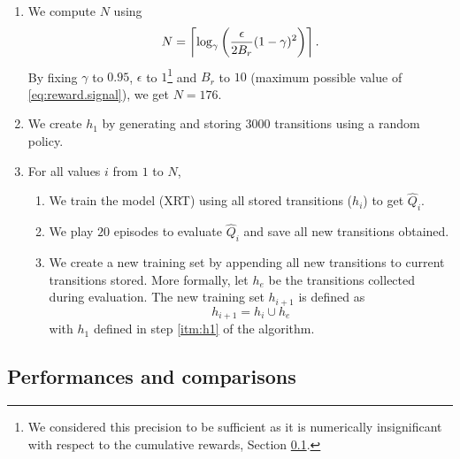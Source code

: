 \documentclass[a4paper, 12pt]{article}
\begin{document}
    \begin{enumerate}
        \item We compute $N$ using
        \begin{equation}
            N = \left\lceil \log_{\gamma} \left(\frac{\epsilon}{2 B_r}(1-\gamma)^2\right) \right\rceil .
        \end{equation}
        By fixing $\gamma$ to $\num{0.95}$, $\epsilon$ to $\num{1}$\footnote{We considered this precision to be sufficient as it is numerically insignificant with respect to the cumulative rewards, \cf{} Section \ref{sec:performances.comparisons}.} and $B_r$ to $\num{10}$ (maximum possible value of \eqref{eq:reward.signal}), we get $N = \num{176}$.
        \item\label{itm:h1} We create $h_1$ by generating and storing $\num{3000}$ transitions using a random policy.
        \item For all values $i$ from $1$ to $N$,
        \begin{enumerate}
            \item We train the model (XRT) using all stored transitions ($h_i$) to get $\hat{Q}_i$.
            \item\label{itm:fqi.evaluation} We play $20$ episodes to evaluate $\hat{Q}_i$ and save all new transitions obtained.
            \item We create a new training set by appending all new transitions to current transitions stored. More formally, let $h_e$ be the transitions collected during evaluation. The new training set $h_{i+1}$ is defined as
            \begin{equation}
                h_{i+1} = h_i \cup h_e
            \end{equation}
            with $h_1$ defined in step \ref{itm:h1} of the algorithm.
        \end{enumerate}
    \end{enumerate}
    
    \subsection{Performances and comparisons}\label{sec:performances.comparisons}
    
\end{document}
